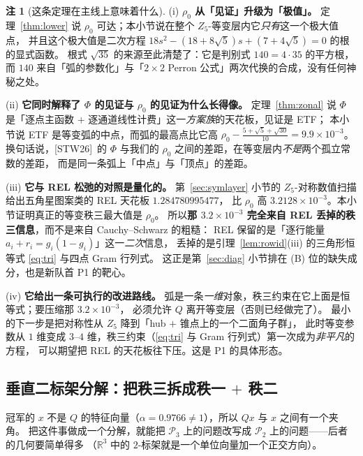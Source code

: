 \documentclass[UTF8,11pt]{ctexart}
\theoremstyle{definition}
\newtheorem{remark}[theorem]{注}
\newcommand{\R}{\mathbb{R}}
\newcommand{\STW}{\textup{[STW26]}}
\begin{document}
\begin{remark}[这条定理在主线上意味着什么]\label{rmk:coneread}
(i) \textbf{$\rho_0$ 从「见证」升级为「极值」。}
定理~\ref{thm:lower} 说 $\rho_0$ 可达；本小节说在整个 $Z_5$-等变层内它\emph{只有}这一个极大值点，
并且这个极大值是二次方程 $18s^2-(18+8\sqrt5)s+(7+4\sqrt5)=0$ 的根的显式函数。
根式 $\sqrt{35}$ 的来源至此清楚了：它是判别式 $140=4\cdot35$ 的平方根，
而 $140$ 来自「弧的参数化」与「$2\times2$ Perron 公式」两次代换的合成，没有任何神秘之处。

(ii) \textbf{它同时解释了 $\Phi$ 的见证与 $\rho_0$ 的见证为什么长得像。}
定理~\ref{thm:zonal} 说 $\Phi$ 是「逐点主函数 $+$ 逐通道线性计费」这一\emph{方案族}的天花板，见证是 ETF；
本小节说 ETF 是等变弧的中点，而弧的最高点比它高 $\rho_0-\frac{5+\sqrt5+\sqrt{30}}{10}=9.9\times10^{-3}$。
换句话说，\STW\ 的 $\Phi$ 与我们的 $\rho_0$ 之间的差距，在等变层内\emph{不是}两个孤立常数的差距，
而是同一条弧上「中点」与「顶点」的差距。

(iii) \textbf{它与 REL 松弛的对照是量化的。}
第~\ref{sec:symlayer} 小节的 $Z_5$-对称数值扫描给出五角星图案类的 REL 天花板 $1.284780995477$，
比 $\rho_0$ 高 $3.2128\times10^{-3}$。本小节证明真正的等变秩三最大值是 $\rho_0$。
所以\textbf{那 $3.2\times10^{-3}$ 完全来自 REL 丢掉的秩三信息}，而不是来自 Cauchy--Schwarz 的粗糙：
REL 保留的是「逐行能量 $a_i+r_i=g_i(1-g_i)$」这一\emph{二次}信息，
丢掉的是引理~\ref{lem:rowid}(iii) 的三角形恒等式 \eqref{eq:tri} 与四点 Gram 行列式。
这正是第~\ref{sec:diag} 小节排在 (B) 位的缺失成分，也是新队首 P1 的靶心。

(iv) \textbf{它给出一条可执行的改进路线。}
弧是一条\emph{一维}对象，秩三约束在它上面是恒等式；要压缩那 $3.2\times10^{-3}$，
必须允许 $Q$ 离开等变层（否则已经做完了）。
最小的下一步是把对称性从 $Z_5$ 降到「hub $+$ 锥点上的一个二面角子群」，
此时等变参数从 $1$ 维变成 $3$--$4$ 维，秩三约束（\eqref{eq:tri} 与 Gram 行列式）第一次成为\emph{非平凡}的方程，
可以期望把 REL 的天花板往下压。这是 P1 的具体形态。
\end{remark}

\subsection{垂直二标架分解：把秩三拆成秩一 $+$ 秩二}\label{sec:perp2}

冠军的 $x$ 不是 $Q$ 的特征向量（$\alpha=0.9766\ne1$），所以 $Qx$ 与 $x$ 之间有一个夹角。
把这件事做成一个分解，就能把 $\mathcal P_3$ 上的问题改写成 $\mathcal P_2$ 上的问题——后者的几何要简单得多
（$\R^3$ 中的 $2$-标架就是一个单位向量加一个正交方向）。
\end{document}
